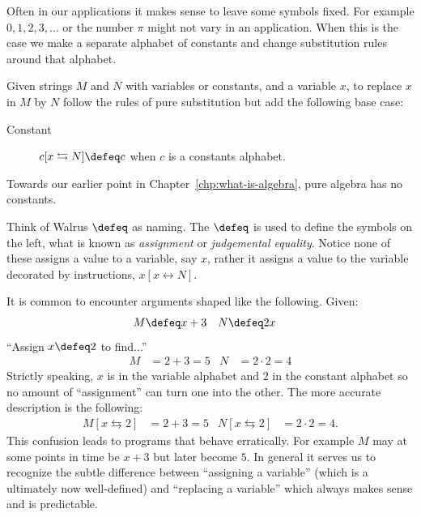 Often in our applications it makes sense to leave some symbols fixed.
For example $0,1,2,3,\ldots$ or the number $\pi$ might not vary in an application.
When this is the case we make a separate alphabet of constants and change substitution 
rules around that alphabet.
\begin{definition}
    Given strings $M$ and $N$ with variables or constants, 
    and a variable $x$, to replace $x$ in $M$ by $N$ 
    follow the rules of pure substitution but add the following  base case:
    \begin{description}
        \item[Constant] $c[x\leftrightarrows N]\defeq c$ when $c$ is a constants alphabet. 
    \end{description}
\end{definition}

Towards our earlier point in Chapter~\ref{chp:what-is-algebra}, pure algebra has no constants.

\begin{remark}
    Think of Walrus $\defeq$ as  naming.
    The $\defeq$ is used to define the symbols on the left, what is 
    known as \emph{assignment} or \emph{judgemental equality}.  Notice none of 
    these assigns a value to a variable, say $x$, rather it assigns a value to the variable 
    decorated by instructions, $x[x\leftrightarrow N]$.  
    
    It is common to encounter arguments shaped like the following.  Given:
    \begin{align*}
        M & \defeq x+3 & N & \defeq 2x
    \end{align*}
    ``Assign $x \defeq 2$ to find...''
    \begin{align*}
        M  & = 2+3 =5 & N & = 2\cdot 2 =4
    \end{align*}
    Strictly speaking, $x$ is in the variable alphabet and $2$ in the constant 
    alphabet so no amount of ``assignment'' can turn one into the other.
    The more accurate description is the following:
    \begin{align*}
        M[x\leftrightarrows 2] & = 2+3=5 & N[x\leftrightarrows 2] & = 2\cdot 2=4.
    \end{align*}
    This confusion leads to programs that behave erratically. For example $M$
    may at some points in time be $x+3$ but later become $5$. In general it
    serves us to recognize the subtle difference between ``assigning a
    variable'' (which is a ultimately now well-defined) 
    and ``replacing a variable'' which always makes sense and is predictable.
\end{remark}

